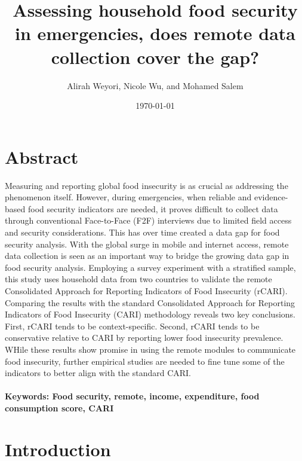 \documentclass[11pt,harvard]{article}
\author{Alirah Weyori, Nicole Wu, and Mohamed Salem}
\date{\today}
\title{Assessing household food security in emergencies, does remote data collection cover the gap?}
\begin{document}
	\maketitle \vspace{-1cm}
	\onehalfspacing
	\pagebreak
	\setlength{\parskip}{8pt} %
	
	\pagebreak
	
	
\section*{Abstract}

Measuring and reporting global food insecurity is as crucial as addressing the phenomenon itself. However, during emergencies, when reliable and evidence-based food security indicators are needed, it proves difficult to collect data through conventional Face-to-Face (F2F) interviews due to limited field access and security considerations. This has over time created a data gap for food security analysis. With the global surge in mobile and internet access, remote data collection is seen as an important way to bridge the growing data gap in food security analysis. Employing a survey experiment with a stratified sample, this study uses household data from two countries to validate the remote Consolidated Approach for Reporting Indicators of Food Insecurity (rCARI). Comparing the results with the standard Consolidated Approach for Reporting Indicators of Food Insecurity (CARI) methodology reveals two key conclusions. First, rCARI tends to be context-specific. Second, rCARI tends to be conservative relative to CARI by reporting lower food insecurity prevalence. WHile these results show promise in using the remote modules to communicate food insecurity, further empirical studies are needed to fine tune some of the indicators to better align with the standard CARI.\\ 		\\ \textbf{Keywords: Food security, remote, income, expenditure, food consumption score, CARI}
  


\pagebreak
	
\section{Introduction}
\end{document}
